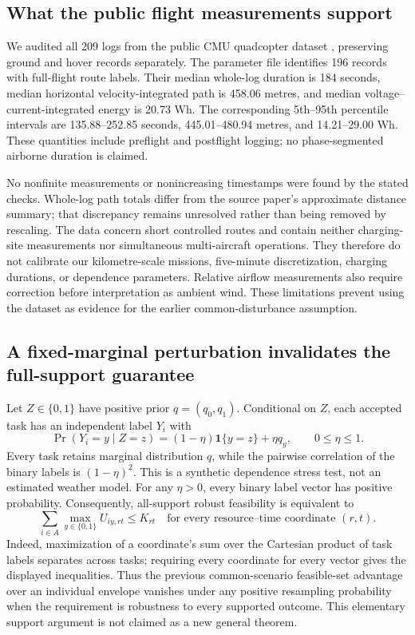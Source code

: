 \documentclass[11pt,a4paper]{article}
\begin{document}
\subsection{What the public flight measurements support}
We audited all 209 logs from the public CMU quadcopter dataset \cite{rodriguesdata}, preserving ground and hover records separately. The parameter file identifies 196 records with full-flight route labels. Their median whole-log duration is 184 seconds, median horizontal velocity-integrated path is 458.06 metres, and median voltage--current-integrated energy is 20.73 Wh. The corresponding 5th--95th percentile intervals are 135.88--252.85 seconds, 445.01--480.94 metres, and 14.21--29.00 Wh. These quantities include preflight and postflight logging; no phase-segmented airborne duration is claimed.

No nonfinite measurements or nonincreasing timestamps were found by the stated checks. Whole-log path totals differ from the source paper's approximate distance summary; that discrepancy remains unresolved rather than being removed by rescaling. The data concern short controlled routes and contain neither charging-site measurements nor simultaneous multi-aircraft operations. They therefore do not calibrate our kilometre-scale missions, five-minute discretization, charging durations, or dependence parameters. Relative airflow measurements also require correction before interpretation as ambient wind. These limitations prevent using the dataset as evidence for the earlier common-disturbance assumption.

\subsection{A fixed-marginal perturbation invalidates the full-support guarantee}
Let $Z\in\{0,1\}$ have positive prior $q=(q_0,q_1)$. Conditional on $Z$, each accepted task has an independent label $Y_i$ with
\begin{equation}
 \Pr(Y_i=y\mid Z=z)=(1-\eta)\mathbf{1}\{y=z\}+\eta q_y,
 \qquad 0\leq\eta\leq1.
\end{equation}
Every task retains marginal distribution $q$, while the pairwise correlation of the binary labels is $(1-\eta)^2$. This is a synthetic dependence stress test, not an estimated weather model. For any $\eta>0$, every binary label vector has positive probability. Consequently, all-support robust feasibility is equivalent to
\begin{equation}
 \sum_{i\in A}\max_{y\in\{0,1\}}U_{iy,rt}\leq K_{rt}
 \quad\text{for every resource--time coordinate }(r,t).
\end{equation}
Indeed, maximization of a coordinate's sum over the Cartesian product of task labels separates across tasks; requiring every coordinate for every vector gives the displayed inequalities. Thus the previous common-scenario feasible-set advantage over an individual envelope vanishes under any positive resampling probability when the requirement is robustness to every supported outcome. This elementary support argument is not claimed as a new general theorem.
\end{document}
